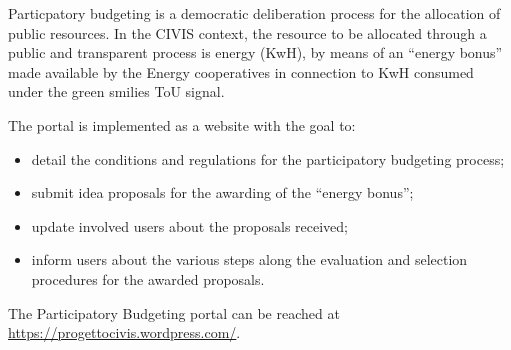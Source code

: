 Particpatory budgeting is a democratic deliberation process for the allocation of public resources. 
In the CIVIS context, the resource to be allocated through a public and transparent process is energy (KwH), by means of an ``energy bonus''
made available by the Energy cooperatives in connection to
KwH consumed under the green smilies ToU signal.

The portal is implemented as a website with the goal to:
\begin{itemize}
 \item detail the conditions and regulations for the participatory budgeting process;
 \item submit idea proposals for the awarding of the ``energy bonus'';
 \item update involved users about the proposals received;
 \item inform users about the various steps along the evaluation and selection procedures for the awarded proposals. 
\end{itemize}
The Participatory Budgeting portal can be reached at \url{https://progettocivis.wordpress.com/}.

%